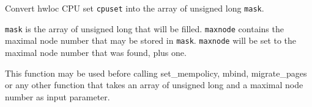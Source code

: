Convert hwloc CPU set {\tt cpuset} into the array of unsigned long {\tt mask}. 

{\tt mask} is the array of unsigned long that will be filled. {\tt maxnode} contains the maximal node number that may be stored in {\tt mask}. {\tt maxnode} will be set to the maximal node number that was found, plus one.

This function may be used before calling set\_\-mempolicy, mbind, migrate\_\-pages or any other function that takes an array of unsigned long and a maximal node number as input parameter. 
